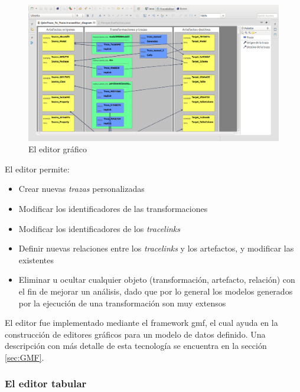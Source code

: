 \documentclass[a4paper,12pt,oneside,spanish]{book}
\begin{document}
\begin{figure}[hbtp]
\centering
\includegraphics[scale=.29]{./img/TraceEditorGrafico}
\caption{El editor gráfico}
\label{fig:TraceEditorGrafico}
\end{figure}


El editor permite:

\begin{itemize}
\item Crear nuevas \textit{trazas} personalizadas
\item Modificar los identificadores de las transformaciones
\item Modificar los identificadores de los \textit{tracelinks}
\item Definir nuevas relaciones entre los \textit{tracelinks} y los artefactos, y modificar las existentes 
\item Eliminar u ocultar cualquier objeto (transformación, artefacto, relación) con el fin de mejorar un análisis, dado que por lo general los modelos generados por la ejecución de una transformación son muy extensos
\end{itemize}


El editor fue implementado mediante el framework \gls{gmf}, el cual ayuda en la construcción de editores gráficos para un modelo de datos definido. Una descripción con más detalle de esta tecnología se encuentra en la sección \ref{sec:GMF}.


\subsubsection{El editor tabular}
\label{subsubsec:EditorTabular}
\end{document}

